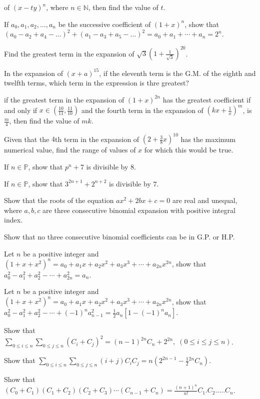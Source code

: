   of $(x - ty)^n$, where $n\in\mathbb{N}$, then find the value of $t$.
\item If $a_0, a_1, a_2, \ldots, a_n$ be the successive coefficient of $(1 + x)^n$, show that $(a_0 - a_2 + a_4 - \ldots)^2 + (a_1
  - a_3 + a_5 - \ldots)^2 = a_0 + a_1 + \cdots + a_n = 2^n$.
\item Find the greatest term in the expansion of $\sqrt{3}\left(1 + \frac{1}{\sqrt{3}}\right)^{20}$.
\item In the expansion of $(x + a)^{15}$, if the eleventh term is the G.M. of the eighth and twelfth terms, which term in the
  expression is thre greatest?
\item if the greatest term in the expansion of $(1 + x)^{2n}$ has the greatest coefficient if and only if $x\in\left(\frac{10}{11},
  \frac{11}{10}\right)$ and the fourth term in the expansion of $\left(kx + \frac{1}{x}\right)^m$, is $\frac{m}{4}$, then find the
  value of $mk$.
\item Given that the $4$th term in the expansion of $\left(2 + \frac{3}{8}x\right)^{10}$ has the maximum numerical value, find the
  range of values of $x$ for which this would be true.
\item If $n\in\mathbb{P}$, show that $p^n + 7$ is divisible by $8$.
\item If $n\in\mathbb{P}$, show that $3^{2n+ 1} + 2^{n + 2}$ is divisible by $7$.
\item Show that the roots of the equation $ax^2 + 2bx + c = 0$ are real and unequal, where $a, b, c$ are three consecutive binomial
  expansion with positive integral index.
\item Show that no three consecutive binomial coefficients can be in G.P. or H.P.
\item Let $n$ be a positive integer and $(1 + x + x^2)^n = a_0 + a_1x + a_2x^2 + a_3x^3 + \cdots + a_{2n}x^{2n}$, show that $a_0^2
  -a_1^2 + a_2^2 - \cdots + a_{2n}^2 = a_n$.
\item Let $n$ be a positive integer and $(1 + x + x^2)^n = a_0 + a_1x + a_2x^2 + a_3x^3 + \cdots + a_{2n}x^{2n}$, show that $a_0^2
  -a_1^2 + a_2^2 - \cdots + (-1)^na_{n - 1}^2 = \frac{1}{2}a_n[1 - (-1)^na_n]$.
\item Show that $\displaystyle\sum_{0\leq i\leq n}\sum_{0\leq j\leq n}(C_i + C_j)^2 = (n - 1)^{2n}C_n + 2^{2n},\;(0\leq i\leq j\leq
  n)$.
\item Show that $\displaystyle\sum_{0\leq i\leq n}\sum_{0\leq j\leq n}(i + j)C_iC_j = n\left(2^{2n - 1} -
  \frac{1}{2}{}^{2n}C_n\right)$.
\item Show that $(C_0 + C_1)(C_1 + C_2)(C_2 + C_3)\cdots (C_{n- 1} + C_n) = \frac{(n + 1)^n}{n!}C_1.C_2.\ldots.C_n$.
